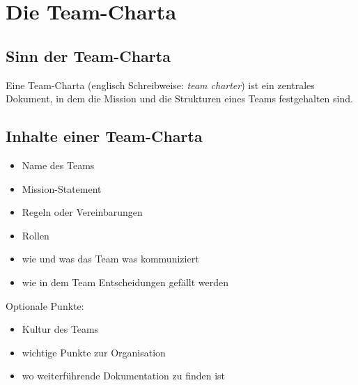 \section{Die Team-Charta}
\label{team-charta}

\subsection{Sinn der Team-Charta}

Eine Team-Charta (englisch Schreibweise: \emph{team charter}) ist ein zentrales Dokument, in dem die Mission und die Strukturen eines Teams festgehalten sind.

\subsection{Inhalte einer Team-Charta}

\begin{itemize}
    \item Name des Teams
    \item Mission-Statement
    \item Regeln oder Vereinbarungen
    \item Rollen
    \item wie und was das Team was kommuniziert
    \item wie in dem Team Entscheidungen gefällt werden
\end{itemize}

Optionale Punkte:

\begin{itemize}
    \item Kultur des Teams
    \item wichtige Punkte zur Organisation
    \item wo weiterführende Dokumentation zu finden ist
\end{itemize}
